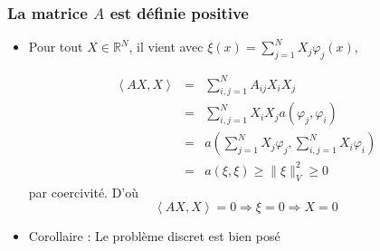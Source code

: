 \documentclass{beamer}
\begin{document}
\begin{frame}
\frametitle{La matrice $A$ est définie positive}

\begin{itemize}
\item Pour tout $X \in \mathbb{R}^N$, il vient avec $\xi(x)=\sum_{j=1}^NX_j\varphi_j(x)$,

\[\begin{array}{ccl}
\left<AX,X\right>&=&\sum_{i,j=1}^NA_{ij}X_iX_j\\
&=& \sum_{i,j=1}^NX_iX_j a(\varphi_j,\varphi_i)\\
&=& a\left(\sum_{j=1}^NX_j \varphi_j,\sum_{i,j=1}^NX_i\varphi_i\right)\\
&=& a\left(\xi,\xi\right)\geq \|\xi\|^2_V\geq 0
\end{array}
\]
par coercivité. D'où
\[\left<AX,X\right>=0\Longrightarrow \xi=0 \Longrightarrow X=0\]
\item Corollaire : Le problème discret est bien posé
\end{itemize}
\end{frame}
\end{document}
